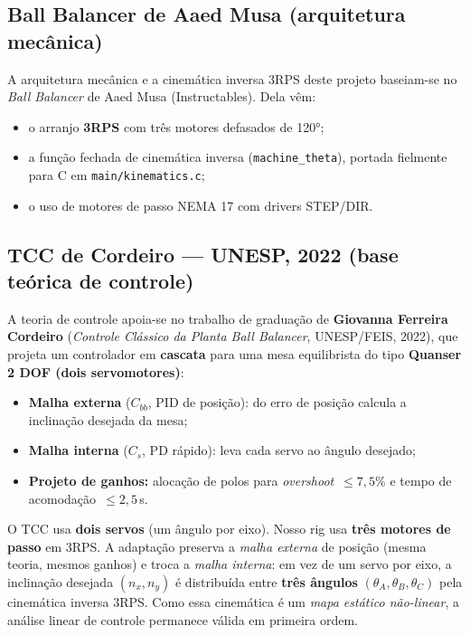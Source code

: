 \documentclass[11pt,a4paper,oneside]{article}
\begin{document}
\subsection{Ball Balancer de Aaed Musa (arquitetura mecânica)}

A arquitetura mecânica e a cinemática inversa 3RPS deste projeto baseiam-se no
\emph{Ball Balancer} de Aaed Musa (Instructables). Dela vêm:

\begin{itemize}
  \item o arranjo \textbf{3RPS} com três motores defasados de 120°;
  \item a função fechada de cinemática inversa (\texttt{machine\_theta}),
  portada fielmente para C em \texttt{main/kinematics.c};
  \item o uso de motores de passo NEMA 17 com drivers STEP/DIR.
\end{itemize}

\subsection{TCC de Cordeiro — UNESP, 2022 (base teórica de controle)}

A teoria de controle apoia-se no trabalho de graduação de \textbf{Giovanna
Ferreira Cordeiro} (\emph{Controle Clássico da Planta Ball Balancer}, UNESP/FEIS,
2022), que projeta um controlador em \textbf{cascata} para uma mesa equilibrista
do tipo \textbf{Quanser 2 DOF (dois servomotores)}:

\begin{itemize}
  \item \textbf{Malha externa} ($C_{bb}$, PID de posição): do erro de posição
  calcula a inclinação desejada da mesa;
  \item \textbf{Malha interna} ($C_s$, PD rápido): leva cada servo ao ângulo
  desejado;
  \item \textbf{Projeto de ganhos:} alocação de polos para
  \emph{overshoot}~$\le 7{,}5\%$ e tempo de acomodação~$\le 2{,}5$\,s.
\end{itemize}

\begin{infobox}
O TCC usa \textbf{dois servos} (um ângulo por eixo). Nosso rig usa \textbf{três
motores de passo} em 3RPS. A adaptação preserva a \emph{malha externa} de
posição (mesma teoria, mesmos ganhos) e troca a \emph{malha interna}: em vez de
um servo por eixo, a inclinação desejada $(n_x, n_y)$ é distribuída entre
\textbf{três ângulos} $(\theta_A,\theta_B,\theta_C)$ pela cinemática inversa
3RPS. Como essa cinemática é um \emph{mapa estático não-linear}, a análise
linear de controle permanece válida em primeira ordem.
\end{infobox}
\end{document}
